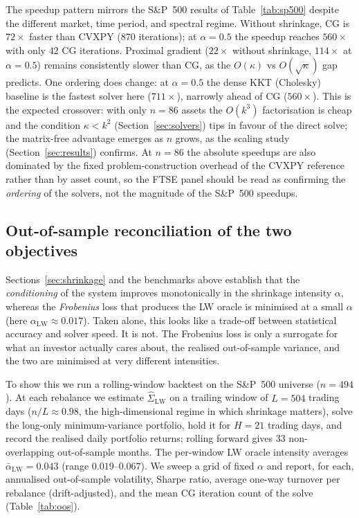 The speedup pattern mirrors the S\&P~500 results of Table~\ref{tab:sp500}
despite the different market, time period, and spectral regime. Without
shrinkage, CG is $72\times$ faster than CVXPY ($870$ iterations);
at $\alpha=0.5$ the speedup reaches $560\times$ with only $42$ CG iterations.
Proximal gradient ($22\times$ without shrinkage, $114\times$ at $\alpha=0.5$)
remains consistently slower than CG, as the $O(\kappa)$ vs $O(\sqrt\kappa)$
gap predicts. One ordering does change: at $\alpha=0.5$ the dense KKT (Cholesky)
baseline is the fastest solver here ($711\times$), narrowly ahead of CG ($560\times$).
This is the expected crossover: with only $n=86$ assets the $O(k^3)$ factorisation
is cheap and the condition $\kappa < k^2$ (Section~\ref{sec:solvers}) tips in favour of
the direct solve; the matrix-free advantage emerges as $n$ grows, as the scaling study
(Section~\ref{sec:results}) confirms. At $n=86$ the absolute
speedups are also dominated by the fixed problem-construction overhead of the CVXPY
reference rather than by asset count, so the FTSE panel should be read as confirming
the \emph{ordering} of the solvers, not the magnitude of the S\&P~500 speedups.

\subsection{Out-of-sample reconciliation of the two objectives}\label{ssec:oos}

Sections~\ref{sec:shrinkage} and the benchmarks above establish that the
\emph{conditioning} of the system improves monotonically in the shrinkage
intensity $\alpha$, whereas the \emph{Frobenius} loss that produces the LW
oracle is minimised at a small $\alpha$ (here $\alpha_{\mathrm{LW}}\approx0.017$).
Taken alone, this looks like a trade-off between statistical accuracy and solver
speed. It is not. The Frobenius loss is only a surrogate for what an investor
actually cares about, the realised out-of-sample variance, and the two are
minimised at very different intensities.

To show this we run a rolling-window backtest on the S\&P~500 universe
($n=494$). At each rebalance we estimate $\hat\Sigma_{\mathrm{LW}}$ on a trailing
window of $L=504$ trading days ($n/L\approx0.98$, the high-dimensional regime in
which shrinkage matters), solve the long-only minimum-variance portfolio, hold it
for $H=21$ trading days, and record the realised daily portfolio returns; rolling
forward gives $33$ non-overlapping out-of-sample months. The per-window LW oracle
intensity averages $\bar\alpha_{\mathrm{LW}}=0.043$ (range $0.019$--$0.067$). We
sweep a grid of fixed $\alpha$ and report, for each, annualised out-of-sample
volatility, Sharpe ratio, average one-way turnover per rebalance (drift-adjusted),
and the mean CG iteration count of the solve (Table~\ref{tab:oos}).

